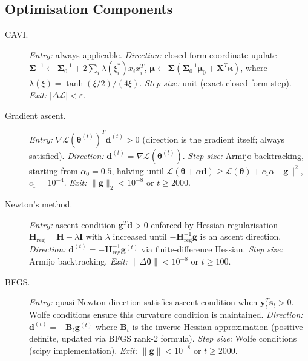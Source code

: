 \documentclass[11pt,a4paper]{article}
\begin{document}
\subsection*{Optimisation Components}

\begin{description}
\item[CAVI.]
  \textit{Entry:} always applicable.
  \textit{Direction:} closed-form coordinate update $\bm{\Sigma}^{-1} \leftarrow
  \bm{\Sigma}_0^{-1} + 2\sum_i\lambda(\xi_i^*)x_ix_i^T$,\;
  $\bm{\mu} \leftarrow \bm{\Sigma}(\bm{\Sigma}_0^{-1}\bm{\mu}_0 + \bm{X}^T\bm{\kappa})$,
  where $\lambda(\xi) = \tanh(\xi/2)/(4\xi)$.
  \textit{Step size:} unit (exact closed-form step).
  \textit{Exit:} $|\Delta\mathcal{L}| < \varepsilon$.

\item[Gradient ascent.]
  \textit{Entry:} $\nabla\mathcal{L}(\bm{\theta}^{(t)})^T\bm{d}^{(t)} > 0$ (direction is
  the gradient itself; always satisfied).
  \textit{Direction:} $\bm{d}^{(t)} = \nabla\mathcal{L}(\bm{\theta}^{(t)})$.
  \textit{Step size:} Armijo backtracking, starting from $\alpha_0 = 0.5$, halving until
  $\mathcal{L}(\bm{\theta}+\alpha\bm{d}) \geq \mathcal{L}(\bm{\theta}) + c_1\alpha\|\bm{g}\|^2$,
  $c_1 = 10^{-4}$.
  \textit{Exit:} $\|\bm{g}\|_2 < 10^{-8}$ or $t \geq 2000$.

\item[Newton's method.]
  \textit{Entry:} ascent condition $\bm{g}^T\bm{d} > 0$ enforced by Hessian regularisation
  $\bm{H}_{\mathrm{reg}} = \bm{H} - \lambda\bm{I}$ with $\lambda$ increased until
  $-\bm{H}_{\mathrm{reg}}^{-1}\bm{g}$ is an ascent direction.
  \textit{Direction:} $\bm{d}^{(t)} = -\bm{H}_{\mathrm{reg}}^{-1}\bm{g}^{(t)}$ via finite-difference
  Hessian.
  \textit{Step size:} Armijo backtracking.
  \textit{Exit:} $\|\Delta\bm{\theta}\| < 10^{-8}$ or $t \geq 100$.

\item[BFGS.]
  \textit{Entry:} quasi-Newton direction satisfies ascent condition when $\bm{y}_t^T\bm{s}_t>0$.
  Wolfe conditions ensure this curvature condition is maintained.
  \textit{Direction:} $\bm{d}^{(t)} = -\bm{B}_t \bm{g}^{(t)}$ where $\bm{B}_t$ is the
  inverse-Hessian approximation (positive definite, updated via BFGS rank-2 formula).
  \textit{Step size:} Wolfe conditions (scipy implementation).
  \textit{Exit:} $\|\bm{g}\| < 10^{-8}$ or $t \geq 2000$.
\end{description}

\end{document}
